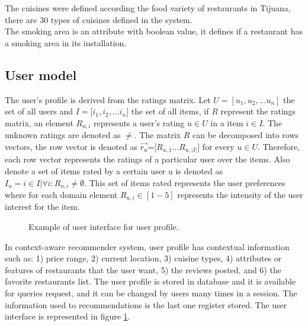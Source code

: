The cuisines were defined according the food variety of restaurants in
Tijuana, there are 30 types of cuisines defined in the system. \\
The smoking area is an attribute with boolean value, it
defines if a restaurant has a smoking area in its installation.

\subsection{User model} 

The user's profile is derived from the ratings matrix. Let $U=[u_1,u_2,...u_n]$
the set of all users and $ I=[i_1,i_2,$...$i_n] $ the set of all items, if $R$
represent the ratings matrix,  an element  $R_{u,i}$ represents a user’s rating
$u \in U$  in a item $i \in I$.  The unknown ratings are denoted as $\neq $. The
matrix $R$ can be decomposed into rows vectors, the row vector is denoted as $
\overrightarrow{r_u} $=$[R_{u,1}$...$R_{u,|I|}]$ for every $u \in U$. Therefore,
each row vector represents the ratings of a particular user over the items. Also
denote a set of items rated by a certain user u is denoted as $ I_u = i \in I |
\forall  i: R_{u,i} \neq \emptyset $. This set of items rated represents the
user preferences where for each domain element $R_{u,i} \in [1-5]$ represents
the intensity of the user interest for  the item.\\  
\begin{figure}
\captionsetup{justification=centering,margin=2cm,font=footnotesize}
\centering
\setlength\fboxsep{0pt}
\caption{Example of user interface for user profile.}
\label{fig:user-profile}      
\end{figure}
In context-aware recommender system, user profile has contextual
information such as: 1) price range, 2) current location, 3) cuisine
types, 4) attributes or features of restaurants that the user want, 5)
the reviews posted, and 6) the favorite restaurants list. The user
profile is stored in database and it is available for queries request,
and it can be changed by users many times in a session. The
information used to recommendations is the last one register stored.
The user interface is represented in figure \ref{fig:user-profile}.


